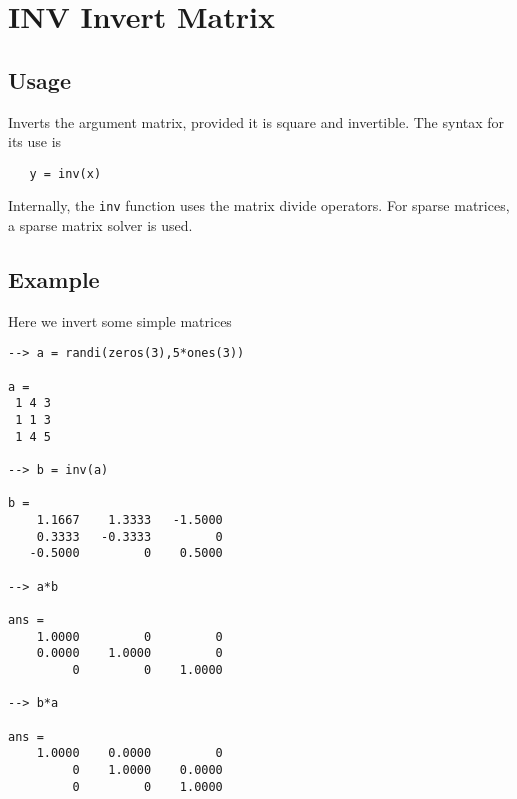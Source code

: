 \section{INV Invert Matrix}

\subsection{Usage}

Inverts the argument matrix, provided it is square and invertible.
The syntax for its use is
\begin{verbatim}
   y = inv(x)
\end{verbatim}
Internally, the \verb|inv| function uses the matrix divide operators.
For sparse matrices, a sparse matrix solver is used.
\subsection{Example}

Here we invert some simple matrices
\begin{verbatim}
--> a = randi(zeros(3),5*ones(3))

a = 
 1 4 3 
 1 1 3 
 1 4 5 

--> b = inv(a)

b = 
    1.1667    1.3333   -1.5000 
    0.3333   -0.3333         0 
   -0.5000         0    0.5000 

--> a*b

ans = 
    1.0000         0         0 
    0.0000    1.0000         0 
         0         0    1.0000 

--> b*a

ans = 
    1.0000    0.0000         0 
         0    1.0000    0.0000 
         0         0    1.0000 
\end{verbatim}
